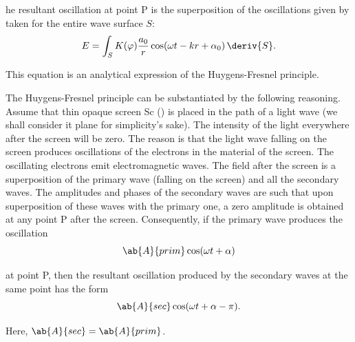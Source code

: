 he resultant oscillation at point P is the superposition of the oscillations given by  taken for the entire wave surface $S$:
\begin{equation}\label{eq:18_2}
    E = \int_S K(\varphi) \frac{a_0}{r} \cos(\omega t - kr + \alpha_0)\, \deriv{S}.
\end{equation}

\noindent
This equation is an analytical expression of the Huygens-Fresnel principle.

The Huygens-Fresnel principle can be substantiated
by the following reasoning.
Assume that thin opaque screen Sc () is
placed in the path of a light wave (we shall consider it plane for simplicity's sake).
The intensity of the light everywhere after the screen will be zero.
The reason is that the light wave falling on the screen produces oscillations of the electrons in the material of the screen.
The oscillating electrons emit electromagnetic waves.
The field after the screen is a superposition of the primary wave (falling on the screen) and all the secondary waves.
The amplitudes and phases of the secondary waves are such that upon superposition of these waves with the primary one, a zero amplitude is obtained at any point P after the screen.
Consequently, if the primary wave produces the oscillation
\begin{equation*}
    \ab{A}{prim} \cos(\omega t + \alpha)
\end{equation*}

\noindent
at point P, then the resultant oscillation produced by the secondary waves at the same point has the form
\begin{equation*}
    \ab{A}{sec} \cos(\omega t + \alpha - \pi).
\end{equation*}

\noindent
Here, $\ab{A}{sec}=\ab{A}{prim}$.

